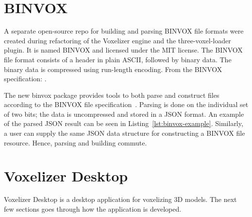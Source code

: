 \section{BINVOX}
\label{sec:method-binvox}
A separate open-source repo for building and parsing BINVOX file formats were created during refactoring of the Voxelizer engine and the three-voxel-loader plugin. It is named BINVOX and licensed under the MIT license. The BINVOX file format consists of a header in plain ASCII, followed by binary data. The binary data is compressed using run-length encoding. From the BINVOX specification: .

The new binvox package provides tools to both parse and construct files according to the BINVOX file specification~\cite{binvox-file-format}. Parsing is done on the individual set of two bits; the data is uncompressed and stored in a JSON format. An example of the parsed JSON result can be seen in Listing~\ref{lst:binvox-example}. Similarly, a user can supply the same JSON data structure for constructing a BINVOX file resource. Hence, parsing and building commute.
\clearpage


\section{Voxelizer Desktop}
Voxelizer Desktop is a desktop application for voxelizing 3D models. The next few sections goes through how the application is developed.

